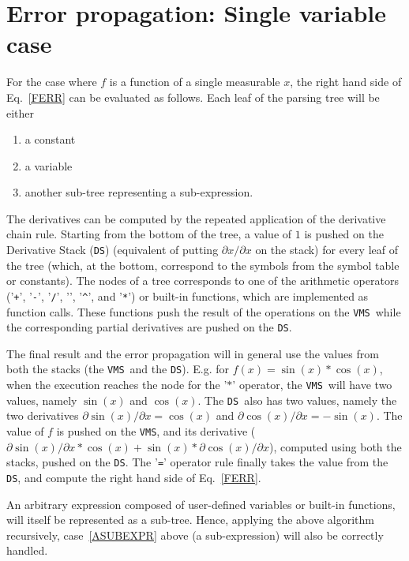 \documentclass[11pt]{article}
\newcommand{\DS}{{\tt DS}}
\newcommand{\VMS}{{\tt VMS}}
\begin{document}
\section{Error propagation: Single variable case}
\label{SEC:SINGLE_VAR}

For the case where $f$ is a function of a single measurable $x$, the
right hand side of Eq.~\ref{FERR} can be evaluated as follows.  Each
leaf of the parsing tree will be either 
\begin{enumerate}[itemsep=1pt,parsep=2pt]
\item a constant 
\item a variable
\item  another sub-tree representing a sub-expression.  \label{ASUBEXPR}
\end{enumerate}
The
derivatives can be computed by the repeated application of the
derivative chain rule.  Starting from the bottom of the tree, a value
of $1$ is pushed on the Derivative Stack (\DS) (equivalent of putting
$\partial x / \partial x$ on the stack) for every leaf of the tree
(which, at the bottom, correspond to the symbols from the symbol
table or constants).  The nodes of a tree corresponds to one of the
arithmetic operators ('{\tt +}', '{\tt -}', '{\tt /}', '{\tt *}',
'{\texttt {\^}}', and '{\tt **}') or built-in functions, which are
implemented as function calls.  These functions push the result of the
operations on the \VMS\ while the corresponding partial derivatives
are pushed on the \DS.

The final result and the error propagation will in general use the
values from both the stacks (the \VMS\ and the \DS).  E.g. for
$f(x)=\sin(x)*\cos(x)$, when the execution reaches the node for the
'$*$' operator, the \VMS\ will have two values, namely $\sin(x)$ and
$\cos(x)$.  The \DS\ also has two values, namely the two derivatives
$\partial \sin(x) / \partial x = \cos(x)$ and $\partial \cos(x) /
\partial x = -\sin(x)$.  The value of $f$ is pushed on the \VMS,
and its derivative ($\partial \sin(x) / \partial x * \cos(x) + \sin(x) *
\partial \cos(x) / \partial x$), computed using both the stacks, pushed
on the \DS.  The '{\tt =}' operator rule finally takes the value from
the \DS, and compute the right hand side of Eq.~\ref{FERR}.

An arbitrary expression composed of user-defined variables or built-in
functions, will itself be represented as a sub-tree.  Hence, applying
the above algorithm recursively, case~\ref{ASUBEXPR} above (a sub-expression)
will also be correctly handled.
\end{document}
